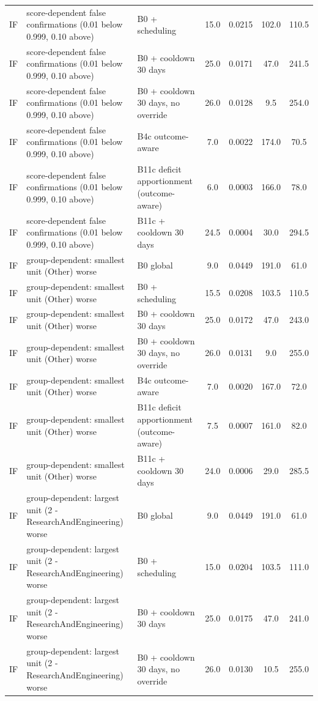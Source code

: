 \begin{longtable}{lp{5.2cm}p{4.4cm}cccc}
IF & score-dependent false confirmations (0.01 below 0.999, 0.10 above) & B0 + scheduling & 15.0 & 0.0215 & 102.0 & 110.5 \\
IF & score-dependent false confirmations (0.01 below 0.999, 0.10 above) & B0 + cooldown 30 days & 25.0 & 0.0171 & 47.0 & 241.5 \\
IF & score-dependent false confirmations (0.01 below 0.999, 0.10 above) & B0 + cooldown 30 days, no override & 26.0 & 0.0128 & 9.5 & 254.0 \\
IF & score-dependent false confirmations (0.01 below 0.999, 0.10 above) & B4c outcome-aware & 7.0 & 0.0022 & 174.0 & 70.5 \\
IF & score-dependent false confirmations (0.01 below 0.999, 0.10 above) & B11c deficit apportionment (outcome-aware) & 6.0 & 0.0003 & 166.0 & 78.0 \\
IF & score-dependent false confirmations (0.01 below 0.999, 0.10 above) & B11c + cooldown 30 days & 24.5 & 0.0004 & 30.0 & 294.5 \\
IF & group-dependent: smallest unit (Other) worse & B0 global & 9.0 & 0.0449 & 191.0 & 61.0 \\
IF & group-dependent: smallest unit (Other) worse & B0 + scheduling & 15.5 & 0.0208 & 103.5 & 110.5 \\
IF & group-dependent: smallest unit (Other) worse & B0 + cooldown 30 days & 25.0 & 0.0172 & 47.0 & 243.0 \\
IF & group-dependent: smallest unit (Other) worse & B0 + cooldown 30 days, no override & 26.0 & 0.0131 & 9.0 & 255.0 \\
IF & group-dependent: smallest unit (Other) worse & B4c outcome-aware & 7.0 & 0.0020 & 167.0 & 72.0 \\
IF & group-dependent: smallest unit (Other) worse & B11c deficit apportionment (outcome-aware) & 7.5 & 0.0007 & 161.0 & 82.0 \\
IF & group-dependent: smallest unit (Other) worse & B11c + cooldown 30 days & 24.0 & 0.0006 & 29.0 & 285.5 \\
IF & group-dependent: largest unit (2 - ResearchAndEngineering) worse & B0 global & 9.0 & 0.0449 & 191.0 & 61.0 \\
IF & group-dependent: largest unit (2 - ResearchAndEngineering) worse & B0 + scheduling & 15.0 & 0.0204 & 103.5 & 111.0 \\
IF & group-dependent: largest unit (2 - ResearchAndEngineering) worse & B0 + cooldown 30 days & 25.0 & 0.0175 & 47.0 & 241.0 \\
IF & group-dependent: largest unit (2 - ResearchAndEngineering) worse & B0 + cooldown 30 days, no override & 26.0 & 0.0130 & 10.5 & 255.0 \\

\end{longtable}
